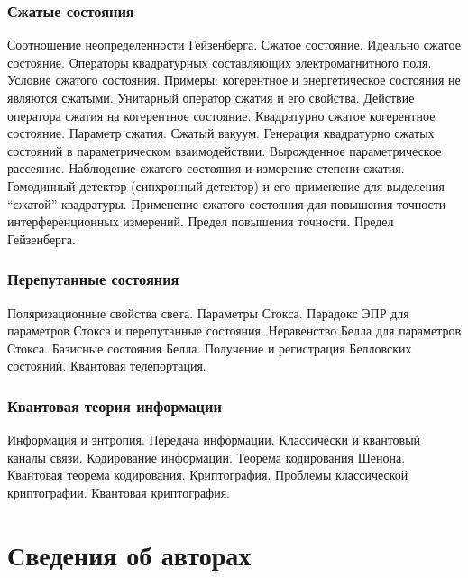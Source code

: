 \subsubsection{Сжатые состояния}
Соотношение неопределенности Гейзенберга. Сжатое состояние. Идеально
сжатое состояние. Операторы квадратурных составляющих
электромагнитного поля. Условие сжатого состояния. Примеры:
когерентное и энергетическое состояния не являются сжатыми. Унитарный
оператор сжатия и его свойства. Действие оператора сжатия на
когерентное состояние. Квадратурно сжатое когерентное
состояние. Параметр сжатия. Сжатый вакуум. Генерация квадратурно
сжатых состояний в параметрическом взаимодействии. Вырожденное
параметрическое рассеяние. Наблюдение сжатого состояния и измерение
степени сжатия. Гомодинный детектор (синхронный детектор) и его
применение для выделения ``сжатой'' квадратуры.  Применение сжатого
состояния для повышения точности интерференционных измерений. Предел
повышения точности. Предел Гейзенберга.
\subsubsection{Перепутанные состояния}
Поляризационные свойства света. Параметры Стокса. Парадокс ЭПР для параметров
  Стокса и перепутанные состояния. Неравенство Белла для параметров
  Стокса. Базисные состояния Белла. Получение и регистрация Белловских
  состояний. Квантовая телепортация.
\subsubsection{Квантовая теория информации}
Информация и энтропия. Передача информации. Классически и квантовый
каналы связи. Кодирование информации. Теорема кодирования
Шенона. Квантовая теорема кодирования. Криптография. Проблемы
классической криптографии. Квантовая криптография.
\newpage
\section{Сведения об авторах}
